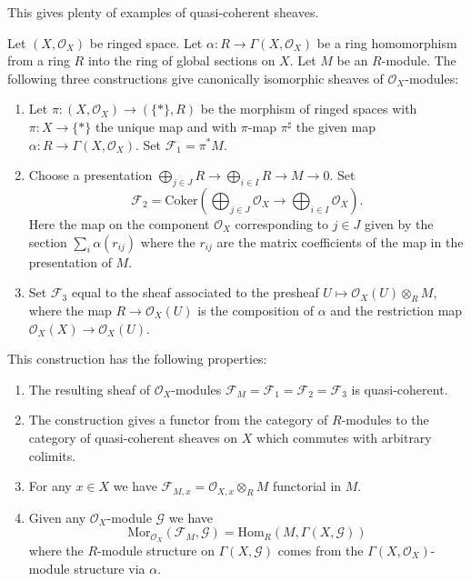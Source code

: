 \noindent
This gives plenty of examples of quasi-coherent sheaves.

\begin{lemma}
\label{lemma-construct-quasi-coherent-sheaves}
Let $(X, \mathcal{O}_X)$ be ringed space.
Let $\alpha : R \to \Gamma(X, \mathcal{O}_X)$ be a ring homomorphism from
a ring $R$ into the ring of global sections on $X$.
Let $M$ be an $R$-module.
The following three constructions give canonically isomorphic
sheaves of $\mathcal{O}_X$-modules:
\begin{enumerate}
\item Let $\pi : (X, \mathcal{O}_X) \longrightarrow (\{*\}, R)$
be the morphism of ringed spaces with $\pi : X \to \{*\}$
the unique map and with $\pi$-map $\pi^\sharp$ the given map
$\alpha : R \to \Gamma(X, \mathcal{O}_X)$. Set $\mathcal{F}_1 = \pi^*M$.
\item Choose a presentation
$\bigoplus_{j \in J} R \to \bigoplus_{i \in I} R \to M \to 0$.
Set
$$
\mathcal{F}_2 = \text{Coker}\left(
\bigoplus\nolimits_{j \in J} \mathcal{O}_X
\to
\bigoplus\nolimits_{i \in I} \mathcal{O}_X
\right).
$$
Here the map on the component $\mathcal{O}_X$ corresponding to $j \in J$
given by the section $\sum_i \alpha(r_{ij})$ where the $r_{ij}$
are the matrix coefficients of the map in the presentation of $M$.
\item Set $\mathcal{F}_3$ equal to the sheaf associated to the presheaf
$U \mapsto \mathcal{O}_X(U) \otimes_R M$, where the map
$R \to \mathcal{O}_X(U)$ is the composition of $\alpha$ and
the restriction map $\mathcal{O}_X(X) \to \mathcal{O}_X(U)$.
\end{enumerate}
This construction has the following properties:
\begin{enumerate}
\item The resulting sheaf of $\mathcal{O}_X$-modules
$\mathcal{F}_M = \mathcal{F}_1 = \mathcal{F}_2 = \mathcal{F}_3$
is quasi-coherent.
\item The construction gives a functor from
the category of $R$-modules to the category of quasi-coherent
sheaves on $X$ which commutes with arbitrary colimits.
\item For any $x \in X$ we have
$\mathcal{F}_{M, x} = \mathcal{O}_{X, x} \otimes_R M$
functorial in $M$.
\item Given any $\mathcal{O}_X$-module
$\mathcal{G}$ we have
$$
\text{Mor}_{\mathcal{O}_X}(\mathcal{F}_M, \mathcal{G})
=
\text{Hom}_R(M, \Gamma(X, \mathcal{G}))
$$
where the $R$-module structure on $\Gamma(X, \mathcal{G})$
comes from the $\Gamma(X, \mathcal{O}_X)$-module structure via
$\alpha$.
\end{enumerate}
\end{lemma}

